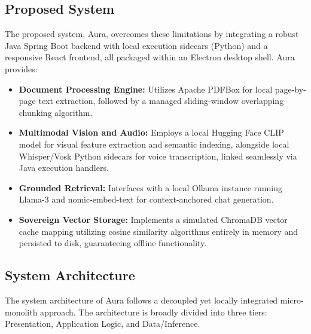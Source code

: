 \subsection{Proposed System}
The proposed system, Aura, overcomes these limitations by integrating a robust Java Spring Boot backend with local execution sidecars (Python) and a responsive React frontend, all packaged within an Electron desktop shell. Aura provides:
\begin{itemize}
    \item \textbf{Document Processing Engine:} Utilizes Apache PDFBox for local page-by-page text extraction, followed by a managed sliding-window overlapping chunking algorithm.
    \item \textbf{Multimodal Vision and Audio:} Employs a local Hugging Face CLIP model for visual feature extraction and semantic indexing, alongside local Whisper/Vosk Python sidecars for voice transcription, linked seamlessly via Java execution handlers.
    \item \textbf{Grounded Retrieval:} Interfaces with a local Ollama instance running Llama-3 and nomic-embed-text for context-anchored chat generation.
    \item \textbf{Sovereign Vector Storage:} Implements a simulated ChromaDB vector cache mapping utilizing cosine similarity algorithms entirely in memory and persisted to disk, guaranteeing offline functionality.
\end{itemize}

\subsection{System Architecture}
The system architecture of Aura follows a decoupled yet locally integrated micro-monolith approach. The architecture is broadly divided into three tiers: Presentation, Application Logic, and Data/Inference.


